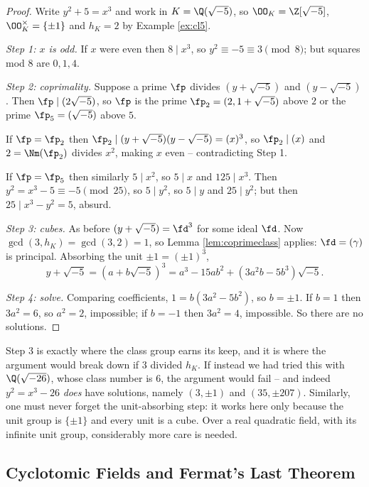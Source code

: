 \begin{proof}
	Write $y^2+5 = x^3$ and work in $K = \Q(\sqrt{-5})$, so $\OO_K = \Z[\sqrt{-5}]$, $\OO_K^\times = \{\pm1\}$ and $h_K = 2$ by Example \ref{ex:cl5}.

	\emph{Step 1: $x$ is odd.} If $x$ were even then $8 \mid x^3$, so $y^2 \equiv -5\equiv 3\pmod 8$; but squares mod $8$ are $0,1,4$.

	\emph{Step 2: coprimality.} Suppose a prime $\fp$ divides $(y+\sqrt{-5})$ and $(y-\sqrt{-5})$. Then $\fp \mid (2\sqrt{-5})$, so $\fp$ is the prime $\fp_2 = (2,1+\sqrt{-5})$ above $2$ or the prime $\fp_5 = (\sqrt{-5})$ above $5$.

	If $\fp = \fp_2$ then $\fp_2 \mid (y+\sqrt{-5})(y-\sqrt{-5}) = (x)^3$, so $\fp_2\mid(x)$ and $2 = \Nm(\fp_2)$ divides $x^2$, making $x$ even -- contradicting Step 1.

	If $\fp = \fp_5$ then similarly $5 \mid x^2$, so $5\mid x$ and $125 \mid x^3$. Then $y^2 = x^3-5 \equiv -5 \pmod{25}$, so $5 \mid y^2$, so $5\mid y$ and $25 \mid y^2$; but then $25 \mid x^3-y^2 = 5$, absurd.

	\emph{Step 3: cubes.} As before $(y+\sqrt{-5}) = \fd^3$ for some ideal $\fd$. Now $\gcd(3, h_K) = \gcd(3,2) = 1$, so Lemma \ref{lem:coprimeclass} applies: $\fd = (\gamma)$ is principal. Absorbing the unit $\pm1 = (\pm1)^3$,
	$$y+\sqrt{-5} = \left(a+b\sqrt{-5}\right)^3 = a^3-15ab^2 + \left(3a^2b-5b^3\right)\sqrt{-5}.$$

	\emph{Step 4: solve.} Comparing coefficients, $1 = b(3a^2-5b^2)$, so $b = \pm1$. If $b = 1$ then $3a^2 = 6$, so $a^2 = 2$, impossible; if $b=-1$ then $3a^2 = 4$, impossible. So there are no solutions.
\end{proof}

\begin{remark}
	Step 3 is exactly where the class group earns its keep, and it is where the argument would break down if $3$ divided $h_K$. If instead we had tried this with $\Q(\sqrt{-26})$, whose class number is $6$, the argument would fail -- and indeed $y^2 = x^3-26$ \emph{does} have solutions, namely $(3,\pm1)$ and $(35,\pm207)$. Similarly, one must never forget the unit-absorbing step: it works here only because the unit group is $\{\pm1\}$ and every unit is a cube. Over a real quadratic field, with its infinite unit group, considerably more care is needed.
\end{remark}

\subsection{Cyclotomic Fields and Fermat's Last Theorem}

